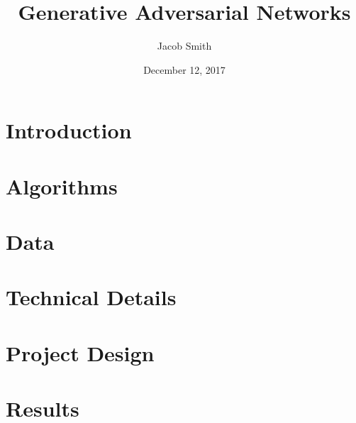 \documentclass[11pt]{article}
\title{Generative Adversarial Networks}
\author{Jacob Smith}
\date{December 12, 2017}
\begin{document}
\maketitle

\section{Introduction}

\section{Algorithms}

\section{Data}

\section{Technical Details}

\section{Project Design}

\section{Results}



\end{document}
